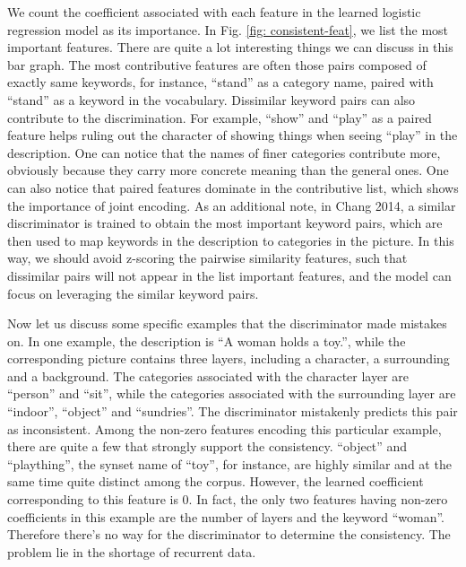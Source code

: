 \documentclass{article} %
\begin{document}
We count the coefficient associated with each feature in the learned logistic regression model as its importance. In Fig. \ref{fig: consistent-feat}, we list the most important features. There are quite a lot interesting things we can discuss in this bar graph. The most contributive features are often those pairs composed of exactly same keywords, for instance, ``stand'' as a category name, paired with ``stand'' as a keyword in the vocabulary.
Dissimilar keyword pairs can also contribute to the discrimination. For example, ``show'' and ``play'' as a paired feature helps ruling out the character of showing things when seeing ``play'' in the description. One can notice that the names of finer categories contribute more, obviously because they carry more concrete meaning than the general ones. One can also notice that paired features dominate in the contributive list, which shows the importance of joint encoding. As an additional note, in Chang 2014, a similar discriminator is trained to obtain the most important keyword pairs, which are then used to map keywords in the description to categories in the picture. In this way, we should avoid z-scoring the pairwise similarity features, such that dissimilar pairs will not appear in the list important features, and the model can focus on leveraging the similar keyword pairs. 

Now let us discuss some specific examples that the discriminator made mistakes on. In one example, the description is ``A woman holds a toy.'', while the corresponding picture contains three layers, including a character, a surrounding and a background. The categories associated with the character layer are ``person'' and ``sit'', while the categories associated with the surrounding layer are ``indoor'', ``object'' and ``sundries''. The discriminator mistakenly predicts this pair as inconsistent. Among the non-zero features encoding this particular example, there are quite a few that strongly support the consistency. ``object'' and ``plaything'', the synset name of ``toy'', for instance, are highly similar and at the same time quite distinct among the corpus. However, the learned coefficient corresponding to this feature is 0. In fact, the only two features having non-zero coefficients in this example are the number of layers and the keyword ``woman''. Therefore there's no way for the discriminator to determine the consistency. The problem lie in the shortage of recurrent data.
\end{document}
